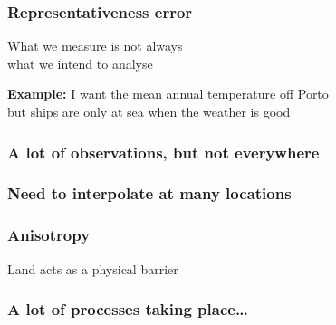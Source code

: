 \begin{frame}[c]
\frametitle{ Representativeness error}

\Large{
What we measure is not always\\
what we intend to analyse
}

\vspace{2cm}

{\large\textbf{Example:} I want the mean annual temperature off Porto\\
but ships are only at sea when the weather is good}

\end{frame}


\begin{frame}[b]
\frametitle{ A lot of observations, but not everywhere}


\end{frame}

\begin{frame}[b]
\frametitle{ Need to interpolate at many locations}
\huge

\end{frame}

\begin{frame}[b]
\frametitle{ Anisotropy}

Land acts as a physical barrier\\


\vspace{.5cm}


\end{frame}

\begin{frame}[c]
\frametitle{ A lot of processes taking place\ldots}

\end{frame}

